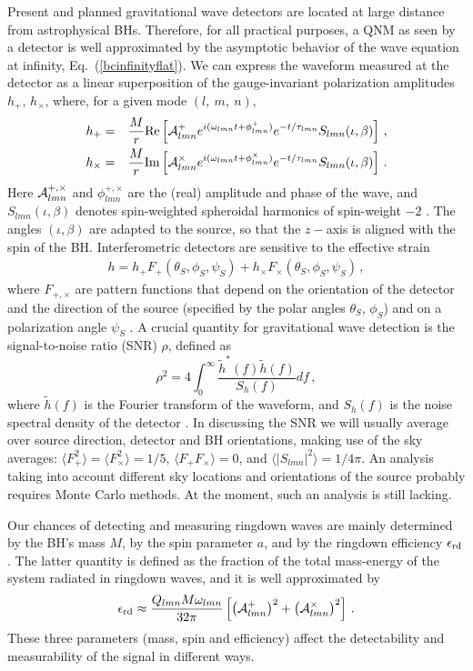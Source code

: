 \documentclass[]{iopart}
\def\be{\begin{equation}}
\def\ee{\end{equation}}
\def\beq{\begin{eqnarray}}
\def\eeq{\end{eqnarray}}
\def\f{\frac}
\def\f{\frac}
\def\om{\omega_{lmn}}
\def\ph{\phi_{lmn}}
\def\ta{\tau_{lmn}}
\def\Slm{S_{lmn}}
\begin{document}
Present and planned gravitational wave detectors are located at large distance
from astrophysical BHs. Therefore, for all practical purposes, a QNM as seen
by a detector is well approximated by the asymptotic behavior of the wave
equation at infinity, Eq.~(\ref{bcinfinityflat}). We can express the waveform
measured at the detector as a linear superposition of the gauge-invariant
polarization amplitudes $h_+,\,h_{\times}$, where, for a given mode
$(l,~m,~n)$,
%
\beq h_{+}&=& \frac{M}{r} {\rm Re}\left[ {\cal A}^{+}_{lmn}
e^{i(\om t+\ph^{+})}e^{-t/\ta} \Slm (\iota,\beta)
\right] \,,\\
%
h_{\times}&=&\frac{M}{r} {\rm Im}\left[ {\cal A}^{\times}_{lmn}
e^{i(\om t+\ph^{\times})} e^{-t/\ta} \Slm (\iota,\beta)
\right]\,.
\label{waveform0}
\eeq 
%
Here ${\cal A}^{+,\times}_{lmn}$ and $\ph^{+,\times}$ are the (real) amplitude
and phase of the wave, and $\Slm (\iota,\beta)$ denotes spin-weighted
spheroidal harmonics of spin-weight $-2$ \cite{Berti:2005ys}. The angles
$(\iota,\beta)$ are adapted to the source, so that the $z-$axis is aligned
with the spin of the BH. Interferometric detectors are sensitive to the
effective strain
%
\beq h = h_{+} F_+(\theta_S,\phi_S,\psi_S) + h_{\times}
F_\times(\theta_S,\phi_S,\psi_S) \,,
\label{detectwave}
\eeq
%
where $F_{+,\times}$ are pattern functions that depend on the orientation of
the detector and the direction of the source (specified by the polar angles
$\theta_S$, $\phi_S$) and on a polarization angle $\psi_S$
\cite{Berti:2005gp,KipThorneBook}.
%
A crucial quantity for gravitational wave detection is the signal-to-noise
ratio (SNR) $\rho$, defined as
%
\be\label{SNRdef}
\rho^2 = 4\int_0^\infty \f{\tilde h^*(f) \tilde h(f)}{S_h(f)}df\,,
\ee
%
where $\tilde h(f)$ is the Fourier transform of the waveform, and $S_h(f)$ is
the noise spectral density of the detector \cite{Finn:1992wt}. In discussing
the SNR we will usually average over source direction, detector and BH
orientations, making use of the sky averages: $\langle F_+^2\rangle=\langle
F_\times^2\rangle=1/5$, $\langle F_+F_\times\rangle=0$, and $\langle |\Slm|^2
\rangle=1/4\pi$. An analysis taking into account different sky locations and
orientations of the source probably requires Monte Carlo methods. At the
moment, such an analysis is still lacking.

Our chances of detecting and measuring ringdown waves are mainly determined by
the BH's mass $M$, by the spin parameter $a$, and by the ringdown efficiency
$\epsilon_{\rm rd}$. The latter quantity is defined as the fraction of the
total mass-energy of the system radiated in ringdown waves, and it is well
approximated by \cite{Berti:2005ys,Flanagan:1997sx}
%
\be\label{epsrd}
\epsilon_{\rm rd}\approx 
\frac{Q_{lmn}M\omega_{lmn}}{32\pi}
\left [\left ({\cal A}^{+}_{lmn}\right )^2 +
\left ({\cal A}^{\times}_{lmn}\right )^2 \right ]\,.
\ee
These three parameters (mass, spin and efficiency) affect the detectability
and measurability of the signal in different ways.
\end{document}
